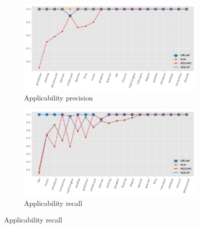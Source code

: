 \begin{figure}[ht]
  \begin{subfigure}[b]{0.45\textwidth}
    \includegraphics[width=\textwidth]{figures/10_traces/lineplots/app_precision_line.png}
    \caption{Applicability precision}
  \end{subfigure}
  \begin{subfigure}[b]{0.45\textwidth}
    \includegraphics[width=\textwidth]{figures/10_traces/lineplots/app_recall_line.png}
    \caption{Applicability recall}
  \end{subfigure}

  \vspace{1em}


\end{figure}
